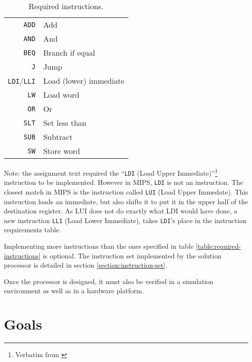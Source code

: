 \begin{table}
    \begin{center}
        \begin{tabular}{r|l}
            \texttt{ADD} & Add \\
            \texttt{AND} & And \\
            \texttt{BEQ} & Branch if equal \\
            \texttt{J} & Jump \\
            \texttt{LDI}/\texttt{LLI} & Load (lower) immediate \\
            \texttt{LW} & Load word \\
            \texttt{OR} & Or \\
            \texttt{SLT} & Set less than \\
            \texttt{SUB} & Subtract \\
            \texttt{SW} & Store word \\
            \hline
        \end{tabular}
        \smallskip
        \smallskip
        \caption{Required instructions.}
        \label{table:required-instructions}
    \end{center}
\end{table}

Note: the assignment text required the ``\texttt{LDI} (Load Upper Immediate)''\footnote{Verbatim from \cite[p.114]{compendium}} instruction to be implemented.
However in MIPS, \texttt{LDI} is not an instruction.
The closest match in MIPS is the instruction called \texttt{LUI} (Load Upper Immedate).
This instruction loads an immediate, but also shifts it to put it in the upper half of the destination register.
As LUI does not do exactly what LDI would have done, a new instruction \texttt{LLI} (Load Lower Immediate), takes \texttt{LDI}'s place in the instruction requirements table.

Implementing more instructions than the ones specified in table \vref{table:required-instructions} is optional.
The instruction set implemented by the solution processor is detailed in section \vref{section:instruction-set}.

Once the processor is designed, it must also be verified in a simulation environment as well as in a hardware platform.

\section{Goals}

